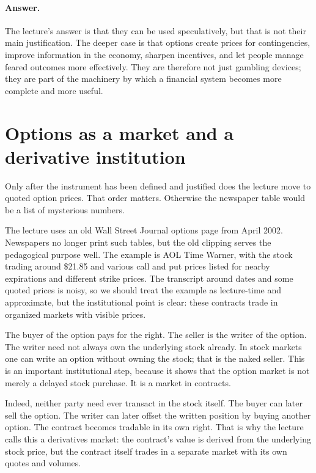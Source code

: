\paragraph{Answer.} The lecture's answer is that they can be used speculatively, but that is not their main justification. The deeper case is that options create prices for contingencies, improve information in the economy, sharpen incentives, and let people manage feared outcomes more effectively. They are therefore not just gambling devices; they are part of the machinery by which a financial system becomes more complete and more useful.

\section{Options as a market and a derivative institution}

Only after the instrument has been defined and justified does the lecture move to quoted option prices. That order matters. Otherwise the newspaper table would be a list of mysterious numbers.

The lecture uses an old Wall Street Journal options page from April 2002. Newspapers no longer print such tables, but the old clipping serves the pedagogical purpose well. The example is AOL Time Warner, with the stock trading around \$21.85 and various call and put prices listed for nearby expirations and different strike prices. The transcript around dates and some quoted prices is noisy, so we should treat the example as lecture-time and approximate, but the institutional point is clear: these contracts trade in organized markets with visible prices.

The buyer of the option pays for the right. The seller is the writer of the option. The writer need not always own the underlying stock already. In stock markets one can write an option without owning the stock; that is the naked seller. This is an important institutional step, because it shows that the option market is not merely a delayed stock purchase. It is a market in contracts.

Indeed, neither party need ever transact in the stock itself. The buyer can later sell the option. The writer can later offset the written position by buying another option. The contract becomes tradable in its own right. That is why the lecture calls this a derivatives market: the contract's value is derived from the underlying stock price, but the contract itself trades in a separate market with its own quotes and volumes.

